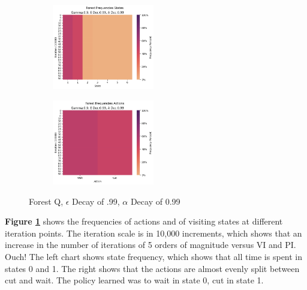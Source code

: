 \documentclass[letterpaper]{article} %
\begin{document}
\begin{figure}[!htb]
	\begin{subfigure}[b]{0.25\textwidth}
		\centering
		\includegraphics[width=1.75in]{Figures/Forest_Frequencies_States_Gamma_0_9__E_Dec_0_99__A_Dec_0_99.png}
  	\end{subfigure}%
	\begin{subfigure}[b]{0.25\textwidth}
		\centering
		\includegraphics[width=1.75in]{Figures/Forest_Frequencies_Actions_Gamma_0_9__E_Dec_0_99__A_Dec_0_99.png}
  	\end{subfigure}%
\caption{Forest Q,  $\epsilon$ Decay of .99, $\alpha$ Decay of 0.99}
\label{fig:forest_q_e_99_a_99_frequencies}
\end{figure}

\textbf{Figure \ref{fig:forest_q_e_99_a_99_frequencies}} shows the frequencies of actions and of visiting states at different iteration points.  The iteration scale is in 10,000 increments, which shows that an increase in the number of iterations of 5 orders of magnitude versus VI and PI. Ouch!  The left chart shows state frequency, which shows that all time is spent in states 0 and 1.  The right shows that the actions are almost evenly split between cut and wait.  The policy learned was to wait in state 0, cut in state 1.
\end{document}
